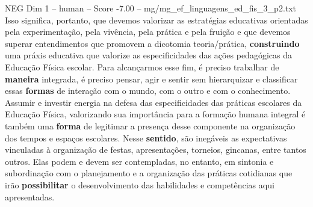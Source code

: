 \begin{textsample}{NEG Dim 1 – human – Score -7.00 – mg/mg\_ef\_linguagens\_ed\_fis\_3\_p2.txt}  \label{ex:f1_neg_003}
Isso significa, portanto, que devemos valorizar as estratégias educativas orientadas pela experimentação, pela vivência, pela prática e pela fruição e que devemos superar entendimentos que promovem a dicotomia teoria/prática, \textbf{construindo} uma práxis educativa que valorize as especificidades das ações pedagógicas da Educação Física escolar.
Para alcançarmos esse fim, é preciso trabalhar de \textbf{maneira} integrada, é preciso pensar, agir e sentir sem hierarquizar e classificar essas \textbf{formas} de interação com o mundo, com o outro e com o conhecimento.
Assumir e investir energia na defesa das especificidades das práticas escolares da Educação Física, valorizando sua importância para a formação humana integral é também uma \textbf{forma} de legitimar a presença desse componente na organização dos tempos e espaços escolares.
Nesse \textbf{sentido}, são inegáveis as expectativas vinculadas à organização de festas, apresentações, torneios, gincanas, entre tantos outros.
Elas podem e devem ser contempladas, no entanto, em sintonia e subordinação com o planejamento e a organização das práticas cotidianas que irão \textbf{possibilitar} o desenvolvimento das habilidades e competências aqui apresentadas.

\end{textsample}
